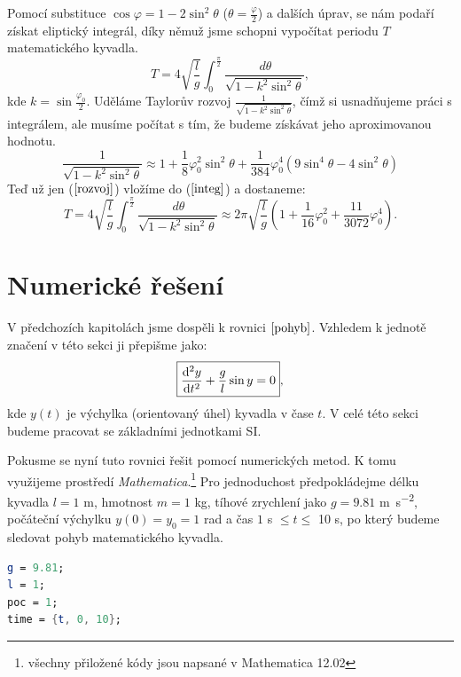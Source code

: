 Pomocí substituce $\cos\varphi=1-2\sin^2\theta$ ($\theta=\frac{\varphi}{2}$) a dalších úprav, se nám podaří získat eliptický integrál, díky němuž jsme schopni vypočítat periodu $T$ matematického kyvadla.
\begin{equation}
\label{integ}
T=4\sqrt{\frac{l}{g}}\int_{0}^{\frac{\pi}{2}}\frac{\,d\theta}{\sqrt{1-k^2\sin^2\theta}},
\end{equation}
kde $k=\sin\frac{\varphi_0}{2}$.
Uděláme Taylorův rozvoj $\frac{1}{\sqrt{1-k^2\sin^2\theta}}$, čímž si usnadňujeme práci s integrálem, ale musíme počítat s tím, že budeme získávat jeho aproximovanou hodnotu.
\begin{equation}
\label{rozvoj}
\frac{1}{\sqrt{1-k^2\sin^2\theta}}\approx1+\frac{1}{8} \varphi_0 ^2 \sin ^2\theta+\frac{1}{384} \varphi_0 ^4 \left(9 \sin ^4\theta-4 \sin
   ^2\theta \right)
\end{equation}
Teď už jen ($\ref{rozvoj}$) vložíme do ($\ref{integ}$) a dostaneme:
\begin{equation}
T=4\sqrt{\frac{l}{g}}\int_{0}^{\frac{\pi}{2}}\frac{\,d\theta}{\sqrt{1-k^2\sin^2\theta}}\approx2\pi\sqrt{\frac{l}{g}}\left(1+\frac{1}{16}\varphi_0^2+\frac{11}{3072}\varphi_0^4\right).
\end{equation}


\section{Numerické řešení}
\label{sec:Numerické řešení}

V předchozích kapitolách jsme dospěli k rovnici $\eqref{pohyb}$. Vzhledem k jednotě značení v této sekci ji přepišme jako:
\begin{equation}
\label{rovnice}
\boxed{\frac{\mathrm{d}^{2} y}{\mathrm{d} t ^{2}} + \frac{g}{l}\sin y=0},
\end{equation}
kde $y(t)$ je výchylka (orientovaný úhel) kyvadla v čase $t$. V celé této sekci budeme pracovat se základními jednotkami SI.

Pokusme se nyní tuto rovnici řešit pomocí numerických metod. K tomu využijeme prostředí \textit{Mathematica}.\footnote{všechny přiložené kódy jsou napsané v Mathematica 12.02}
Pro jednoduchost předpokládejme délku kyvadla $l=1$ \si{m}, hmotnost $m = 1$ \si{kg}, tíhové zrychlení jako $g = 9.81$ \si{m.s^{-2}}, počáteční výchylku $y(0)=y_{0}=1$ \si{rad} a čas $1$ \si{s} $\leq t \leq$ 10 \si{s}, po který budeme sledovat pohyb matematického kyvadla.
\begin{lstlisting}[language=Mathematica, caption=Konstanty]
g = 9.81;
l = 1;
poc = 1;
time = {t, 0, 10};
\end{lstlisting}

